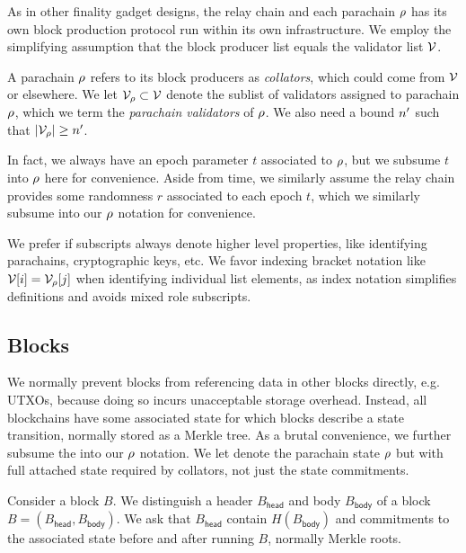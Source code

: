 As in other finality gadget designs, the relay chain and each parachain $\rho$ has its own block production protocol run within its own infrastructure.  We employ the simplifying assumption that the block producer list equals the validator list $\mathcal{V}$.  


A parachain $\rho$ refers to its block producers as {\em collators}, which could come from $\mathcal{V}$ or elsewhere.  We let $\mathcal{V}_{\rho} \subset \mathcal{V}$ denote the sublist of validators assigned to parachain $\rho$, which we term the {\em parachain validators} of $\rho$.  We also need a bound $n'$ such that $|\mathcal{V}_{\rho}| \ge n'$.

In fact, we always have an epoch parameter $t$ associated to $\rho$, but we subsume $t$ into $\rho$ here for convenience.  Aside from time, we similarly assume the relay chain provides some randomness $r$ associated to each epoch $t$, which we similarly subsume into our $\rho$ notation for convenience.

We prefer if subscripts always denote higher level properties, like identifying parachains, cryptographic keys, etc.  We favor indexing bracket notation like $\mathcal{V}[i] = \mathcal{V}_{\rho}[j]$ when identifying individual list elements, as index notation simplifies definitions and avoids mixed role subscripts. 

\subsection{Blocks}

We normally prevent blocks from referencing data in other blocks directly, e.g. UTXOs, because doing so incurs unacceptable storage overhead.  Instead, all blockchains have some associated state for which blocks describe a state transition, normally stored as a Merkle tree.  As a brutal convenience, we further subsume the  into our $\rho$ notation.  We let  denote the parachain state $\rho$ but with full attached state required by collators, not just the state commitments. 

Consider a block $B$.  We distinguish a header $B_{\mathsf{head}}$ and body $B_{\mathsf{body}}$ of a block $B = (B_{\mathsf{head}},B_{\mathsf{body}})$.  We ask that $B_{\mathsf{head}}$ contain $H(B_{\mathsf{body}})$ and commitments to the associated state before and after running $B$, normally Merkle roots.  

